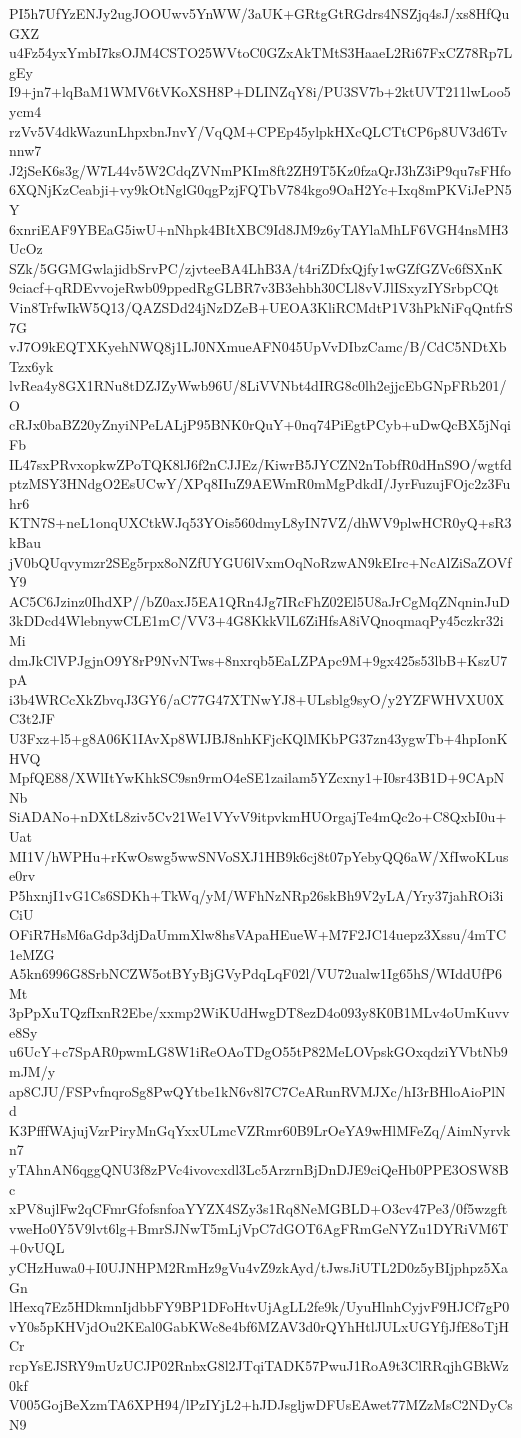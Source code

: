 PI5h7UfYzENJy2ugJOOUwv5YnWW/3aUK+GRtgGtRGdrs4NSZjq4sJ/xs8HfQuGXZ
u4Fz54yxYmbI7ksOJM4CSTO25WVtoC0GZxAkTMtS3HaaeL2Ri67FxCZ78Rp7LgEy
I9+jn7+lqBaM1WMV6tVKoXSH8P+DLINZqY8i/PU3SV7b+2ktUVT211lwLoo5ycm4
rzVv5V4dkWazunLhpxbnJnvY/VqQM+CPEp45ylpkHXcQLCTtCP6p8UV3d6Tvnnw7
J2jSeK6s3g/W7L44v5W2CdqZVNmPKIm8ft2ZH9T5Kz0fzaQrJ3hZ3iP9qu7sFHfo
6XQNjKzCeabji+vy9kOtNglG0qgPzjFQTbV784kgo9OaH2Yc+Ixq8mPKViJePN5Y
6xnriEAF9YBEaG5iwU+nNhpk4BItXBC9Id8JM9z6yTAYlaMhLF6VGH4nsMH3UcOz
SZk/5GGMGwlajidbSrvPC/zjvteeBA4LhB3A/t4riZDfxQjfy1wGZfGZVc6fSXnK
9ciacf+qRDEvvojeRwb09ppedRgGLBR7v3B3ehbh30CLl8vVJlISxyzIYSrbpCQt
Vin8TrfwIkW5Q13/QAZSDd24jNzDZeB+UEOA3KliRCMdtP1V3hPkNiFqQntfrS7G
vJ7O9kEQTXKyehNWQ8j1LJ0NXmueAFN045UpVvDIbzCamc/B/CdC5NDtXbTzx6yk
lvRea4y8GX1RNu8tDZJZyWwb96U/8LiVVNbt4dIRG8c0lh2ejjcEbGNpFRb201/O
cRJx0baBZ20yZnyiNPeLALjP95BNK0rQuY+0nq74PiEgtPCyb+uDwQcBX5jNqiFb
IL47sxPRvxopkwZPoTQK8lJ6f2nCJJEz/KiwrB5JYCZN2nTobfR0dHnS9O/wgtfd
ptzMSY3HNdgO2EsUCwY/XPq8IIuZ9AEWmR0mMgPdkdI/JyrFuzujFOjc2z3Fuhr6
KTN7S+neL1onqUXCtkWJq53YOis560dmyL8yIN7VZ/dhWV9plwHCR0yQ+sR3kBau
jV0bQUqvymzr2SEg5rpx8oNZfUYGU6lVxmOqNoRzwAN9kEIrc+NcAlZiSaZOVfY9
AC5C6Jzinz0IhdXP//bZ0axJ5EA1QRn4Jg7IRcFhZ02El5U8aJrCgMqZNqninJuD
3kDDcd4WlebnywCLE1mC/VV3+4G8KkkVlL6ZiHfsA8iVQnoqmaqPy45czkr32iMi
dmJkClVPJgjnO9Y8rP9NvNTws+8nxrqb5EaLZPApc9M+9gx425s53lbB+KszU7pA
i3b4WRCcXkZbvqJ3GY6/aC77G47XTNwYJ8+ULsblg9syO/y2YZFWHVXU0XC3t2JF
U3Fxz+l5+g8A06K1IAvXp8WIJBJ8nhKFjcKQlMKbPG37zn43ygwTb+4hpIonKHVQ
MpfQE88/XWlItYwKhkSC9sn9rmO4eSE1zailam5YZcxny1+I0sr43B1D+9CApNNb
SiADANo+nDXtL8ziv5Cv21We1VYvV9itpvkmHUOrgajTe4mQc2o+C8QxbI0u+Uat
MI1V/hWPHu+rKwOswg5wwSNVoSXJ1HB9k6cj8t07pYebyQQ6aW/XfIwoKLuse0rv
P5hxnjI1vG1Cs6SDKh+TkWq/yM/WFhNzNRp26skBh9V2yLA/Yry37jahROi3iCiU
OFiR7HsM6aGdp3djDaUmmXlw8hsVApaHEueW+M7F2JC14uepz3Xssu/4mTC1eMZG
A5kn6996G8SrbNCZW5otBYyBjGVyPdqLqF02l/VU72ualw1Ig65hS/WIddUfP6Mt
3pPpXuTQzfIxnR2Ebe/xxmp2WiKUdHwgDT8ezD4o093y8K0B1MLv4oUmKuvve8Sy
u6UcY+c7SpAR0pwmLG8W1iReOAoTDgO55tP82MeLOVpskGOxqdziYVbtNb9mJM/y
ap8CJU/FSPvfnqroSg8PwQYtbe1kN6v8l7C7CeARunRVMJXc/hI3rBHloAioPlNd
K3PfffWAjujVzrPiryMnGqYxxULmcVZRmr60B9LrOeYA9wHlMFeZq/AimNyrvkn7
yTAhnAN6qggQNU3f8zPVc4ivovcxdl3Lc5ArzrnBjDnDJE9ciQeHb0PPE3OSW8Bc
xPV8ujlFw2qCFmrGfofsnfoaYYZX4SZy3s1Rq8NeMGBLD+O3cv47Pe3/0f5wzgft
vweHo0Y5V9lvt6lg+BmrSJNwT5mLjVpC7dGOT6AgFRmGeNYZu1DYRiVM6T+0vUQL
yCHzHuwa0+I0UJNHPM2RmHz9gVu4vZ9zkAyd/tJwsJiUTL2D0z5yBIjphpz5XaGn
lHexq7Ez5HDkmnIjdbbFY9BP1DFoHtvUjAgLL2fe9k/UyuHlnhCyjvF9HJCf7gP0
vY0s5pKHVjdOu2KEal0GabKWc8e4bf6MZAV3d0rQYhHtlJULxUGYfjJfE8oTjHCr
rcpYsEJSRY9mUzUCJP02RnbxG8l2JTqiTADK57PwuJ1RoA9t3ClRRqjhGBkWz0kf
V005GojBeXzmTA6XPH94/lPzIYjL2+hJDJsgljwDFUsEAwet77MZzMsC2NDyCsN9
